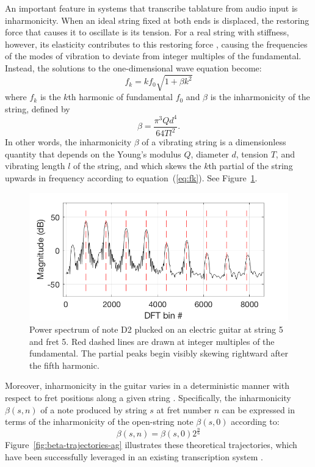 \documentclass[convention,peer-reviewed]{aesconf}
\begin{document}
An important feature in systems that transcribe tablature from audio input is inharmonicity. When an ideal string fixed at both ends is displaced, the restoring force that causes it to oscillate is its tension. For a real string with stiffness, however, its elasticity contributes to this restoring force \citep{fletcher1962}, causing the frequencies of the modes of vibration to deviate from integer multiples of the fundamental. Instead, the solutions to the one-dimensional wave equation become: 
\begin{equation}
\label{eq:fk}
f_k = kf_{0}\sqrt{1+\beta k^2}
\end{equation}
where $f_k$ is the $k$th harmonic of fundamental $f_0$ and $\beta$ is the inharmonicity of the string, defined by
\begin{equation}
\beta = \frac{\pi^3 Q d^4}{64 T l^2}. \label{eq:beta}
\end{equation}
In other words, the inharmonicity $\beta$ of a vibrating string is a dimensionless quantity that depends on the Young's modulus $Q$, diameter $d$, tension $T$, and vibrating length $l$ of the string, and which skews the $k$th partial of the string upwards in frequency according to equation~(\ref{eq:fk}). See Figure~\ref{fig:skew}. 

\begin{figure}[!htbp]
\centering
\includegraphics[scale=0.3]{skew}
\caption{Power spectrum of note D2 plucked on an electric guitar at string 5 and fret 5. Red dashed lines are drawn at integer multiples of the fundamental. The partial peaks begin visibly skewing rightward after the fifth harmonic.}
\label{fig:skew}
\end{figure}

Moreover, inharmonicity in the guitar varies in a deterministic manner with respect to fret positions along a given string \citep{barbanchoi2012}. Specifically, the inharmonicity $\beta(s,n)$ of a note produced by string $s$ at fret number $n$ can be expressed in terms of the inharmonicity of the open-string note $\beta(s,0)$ according to:
\begin{equation} 
\label{eq:beta-traj}
\beta(s,n) = \beta(s,0)2^{\frac{n}{6}}
\end{equation}
Figure~\ref{fig:beta-trajectories-ag} illustrates these theoretical trajectories, which have been successfully leveraged in an existing transcription system \citep{barbanchoi2012}.
\end{document}
